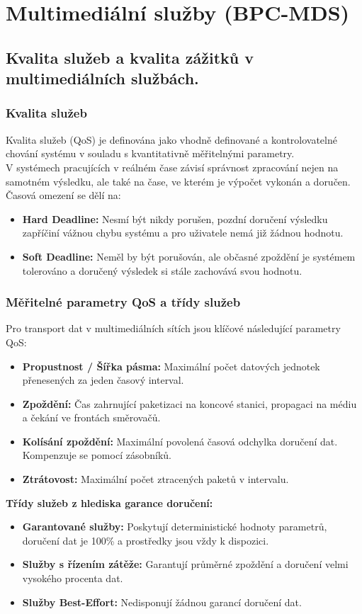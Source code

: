 \section{Multimediální služby (BPC-MDS)}
\subsection{Kvalita služeb a kvalita zážitků v multimediálních službách.}
    \subsubsection{Kvalita služeb}
        Kvalita služeb (QoS) je definována jako vhodně definované a kontrolovatelné chování systému v souladu s kvantitativně měřitelnými parametry. \\
        V systémech pracujících v reálném čase závisí správnost zpracování nejen na samotném výsledku, ale také na čase, ve kterém je výpočet vykonán a doručen. Časová omezení se dělí na:
        \begin{itemize}
            \item \textbf{Hard Deadline:} Nesmí být nikdy porušen, pozdní doručení výsledku zapříčiní vážnou chybu systému a pro uživatele nemá již žádnou hodnotu.
            \item \textbf{Soft Deadline:} Neměl by být porušován, ale občasné zpoždění je systémem tolerováno a doručený výsledek si stále zachovává svou hodnotu.
        \end{itemize}
    \subsubsection{Měřitelné parametry QoS a třídy služeb}
        Pro transport dat v multimediálních sítích jsou klíčové následující parametry QoS:
        \begin{itemize}
            \item \textbf{Propustnost / Šířka pásma:} Maximální počet datových jednotek přenesených za jeden časový interval.
            \item \textbf{Zpoždění:} Čas zahrnující paketizaci na koncové stanici, propagaci na médiu a čekání ve frontách směrovačů.
            \item \textbf{Kolísání zpoždění:} Maximální povolená časová odchylka doručení dat. Kompenzuje se pomocí zásobníků.
            \item \textbf{Ztrátovost:} Maximální počet ztracených paketů v intervalu.
        \end{itemize}
        \textbf{Třídy služeb z hlediska garance doručení:}
        \begin{itemize}
            \item \textbf{Garantované služby:} Poskytují deterministické hodnoty parametrů, doručení dat je 100\% a prostředky jsou vždy k dispozici.
            \item \textbf{Služby s řízením zátěže:} Garantují průměrné zpoždění a doručení velmi vysokého procenta dat.
            \item \textbf{Služby Best-Effort:} Nedisponují žádnou garancí doručení dat.
        \end{itemize}
